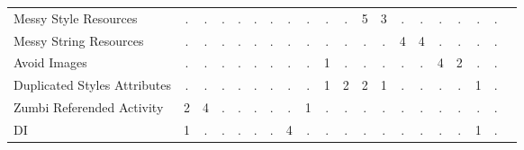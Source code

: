 \begin{table*}[t]
\begin{tabular}{p{4cm}|p{.3cm}p{.3cm}p{.3cm}p{.3cm}p{.3cm}p{.3cm}p{.3cm}p{.3cm}p{.3cm}p{.4cm}p{.4cm}p{.4cm}p{.4cm}p{.4cm}p{.4cm}p{.4cm}p{.4cm}p{.4cm}p{.4cm}}
Messy Style Resources								& \multicolumn{1}{c}{.}	& \multicolumn{1}{c}{.}	& \multicolumn{1}{c}{.}	& \multicolumn{1}{c}{.}	& \multicolumn{1}{c}{.}	& \multicolumn{1}{c}{.}	& \multicolumn{1}{c}{.}	& \multicolumn{1}{c}{.}	& \multicolumn{1}{c}{.}	& \multicolumn{1}{c}{.}	& \multicolumn{1}{c}{5}	& \multicolumn{1}{c}{3}	& \multicolumn{1}{c}{.}	& \multicolumn{1}{c}{.}	& \multicolumn{1}{c}{.}	& \multicolumn{1}{c}{.}	& \multicolumn{1}{c}{.}	& \multicolumn{1}{c}{.} 		 \\
Messy String Resources								& \multicolumn{1}{c}{.}	& \multicolumn{1}{c}{.}	& \multicolumn{1}{c}{.}	& \multicolumn{1}{c}{.}	& \multicolumn{1}{c}{.}	& \multicolumn{1}{c}{.}	& \multicolumn{1}{c}{.}	& \multicolumn{1}{c}{.}	& \multicolumn{1}{c}{.}	& \multicolumn{1}{c}{.}	& \multicolumn{1}{c}{.}	& \multicolumn{1}{c}{.}	& \multicolumn{1}{c}{4}	& \multicolumn{1}{c}{4}	& \multicolumn{1}{c}{.}	& \multicolumn{1}{c}{.}	& \multicolumn{1}{c}{.}	& \multicolumn{1}{c}{.} 		 \\
Avoid Images										& \multicolumn{1}{c}{.}	& \multicolumn{1}{c}{.}	& \multicolumn{1}{c}{.}	& \multicolumn{1}{c}{.}	& \multicolumn{1}{c}{.}	& \multicolumn{1}{c}{.}	& \multicolumn{1}{c}{.}	& \multicolumn{1}{c}{.}	& \multicolumn{1}{c}{1}	& \multicolumn{1}{c}{.}	& \multicolumn{1}{c}{.}	& \multicolumn{1}{c}{.}	& \multicolumn{1}{c}{.}	& \multicolumn{1}{c}{.}	& \multicolumn{1}{c}{4}	& \multicolumn{1}{c}{2}	& \multicolumn{1}{c}{.}	& \multicolumn{1}{c}{.} 		 \\
Duplicated Styles Attributes						& \multicolumn{1}{c}{.}	& \multicolumn{1}{c}{.}	& \multicolumn{1}{c}{.}	& \multicolumn{1}{c}{.}	& \multicolumn{1}{c}{.}	& \multicolumn{1}{c}{.}	& \multicolumn{1}{c}{.}	& \multicolumn{1}{c}{.}	& \multicolumn{1}{c}{1}	& \multicolumn{1}{c}{2}	& \multicolumn{1}{c}{2}	& \multicolumn{1}{c}{1}	& \multicolumn{1}{c}{.}	& \multicolumn{1}{c}{.}	& \multicolumn{1}{c}{.}	& \multicolumn{1}{c}{.}	& \multicolumn{1}{c}{1}	& \multicolumn{1}{c}{.} 		 \\
Zumbi Referended Activity							& \multicolumn{1}{c}{2}	& \multicolumn{1}{c}{4}	& \multicolumn{1}{c}{.}	& \multicolumn{1}{c}{.}	& \multicolumn{1}{c}{.}	& \multicolumn{1}{c}{.}	& \multicolumn{1}{c}{.}	& \multicolumn{1}{c}{1}	& \multicolumn{1}{c}{.}	& \multicolumn{1}{c}{.}	& \multicolumn{1}{c}{.}	& \multicolumn{1}{c}{.}	& \multicolumn{1}{c}{.}	& \multicolumn{1}{c}{.}	& \multicolumn{1}{c}{.}	& \multicolumn{1}{c}{.}	& \multicolumn{1}{c}{.}	& \multicolumn{1}{c}{.} 		 \\
DI													& \multicolumn{1}{c}{1}	& \multicolumn{1}{c}{.}	& \multicolumn{1}{c}{.}	& \multicolumn{1}{c}{.}	& \multicolumn{1}{c}{.}	& \multicolumn{1}{c}{.}	& \multicolumn{1}{c}{4}	& \multicolumn{1}{c}{.}	& \multicolumn{1}{c}{.}	& \multicolumn{1}{c}{.}	& \multicolumn{1}{c}{.}	& \multicolumn{1}{c}{.}	& \multicolumn{1}{c}{.}	& \multicolumn{1}{c}{.}	& \multicolumn{1}{c}{.}	& \multicolumn{1}{c}{.}	& \multicolumn{1}{c}{1}	& \multicolumn{1}{c}{.} 		 \\

\end{tabular}
\end{table*}
